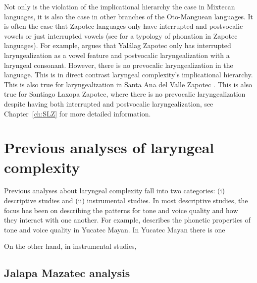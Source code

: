 Not only is the violation of the implicational hierarchy the case in Mixtecan languages, it is also the case in other branches of the Oto-Manguean languages. It is often the case that Zapotec languages only have interrupted and postvocalic vowels or just interrupted vowels (see \cite{ariza-garciaPhonationTypesTones2018} for a typology of phonation in Zapotec languages). For example, \citet{avelinobecerraTopicsYalalagZapotec2004,avelinoAcousticElectroglottographicAnalyses2010} argues that Yalálag Zapotec only has interrupted laryngealization as a vowel feature and postvocalic laryngealization with a laryngeal consonant. However, there is no prevocalic laryngealization in the language. This is in direct contrast laryngeal complexity's implicational hierarchy. This is also true for laryngealization in Santa Ana del Valle Zapotec \citep{espositoSantaAnaValle2004,espositoAcousticElectroglottographicStudy2012}. This is also true for Santiago Laxopa Zapotec, where there is no prevocalic laryngealization despite having both interrupted and postvocalic laryngealization, see Chapter~\ref{ch:SLZ} for more detailed information.

\section{Previous analyses of laryngeal complexity}\label{sec:previous_analyses}

Previous analyses about laryngeal complexity fall into two categories: (i) descriptive studies and (ii) instrumental studies. In most descriptive studies, the focus has been on describing the patterns for tone and voice quality and how they interact with one another. For example, \citet{frazierPhoneticsYucatecMaya2013} describes the phonetic properties of tone and voice quality in Yucatec Mayan. In Yucatec Mayan there is one 

On the other hand, in instrumental studies, 

\subsection{Jalapa Mazatec analysis}\label{sec:jalapa_mazatec_analysis}





